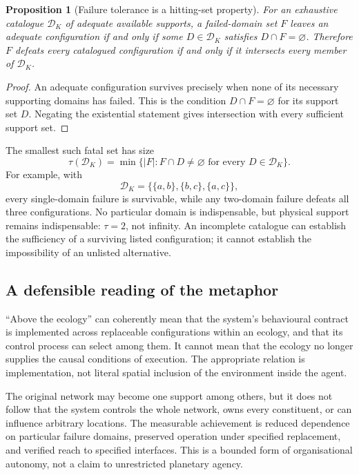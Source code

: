 \documentclass[11pt,a4paper]{article}
\newtheorem{proposition}[theorem]{Proposition}
\theoremstyle{definition}
\theoremstyle{remark}
\newcommand{\calK}{K}
\begin{document}
\begin{proposition}[Failure tolerance is a hitting-set property]\label{prop:hitting}
For an exhaustive catalogue $\mathscr D_{\calK}$ of adequate available supports, a failed-domain set $F$ leaves an adequate configuration if and only if some $D\in\mathscr D_{\calK}$ satisfies $D\cap F=\varnothing$. Therefore $F$ defeats every catalogued configuration if and only if it intersects every member of $\mathscr D_{\calK}$.
\end{proposition}
\begin{proof}
An adequate configuration survives precisely when none of its necessary supporting domains has failed. This is the condition $D\cap F=\varnothing$ for its support set $D$. Negating the existential statement gives intersection with every sufficient support set.
\end{proof}
The smallest such fatal set has size
\[
 \tau(\mathscr D_{\calK})
 =\min\{|F|:F\cap D\neq\varnothing\text{ for every }D\in\mathscr D_{\calK}\}.
\]
For example, with
\begin{equation}\label{eq:triangle}
 \mathscr D_{\calK}=\{\{a,b\},\{b,c\},\{a,c\}\},
\end{equation}
every single-domain failure is survivable, while any two-domain failure defeats all three configurations. No particular domain is indispensable, but physical support remains indispensable: $\tau=2$, not infinity. An incomplete catalogue can establish the sufficiency of a surviving listed configuration; it cannot establish the impossibility of an unlisted alternative.

\subsection{A defensible reading of the metaphor}
``Above the ecology'' can coherently mean that the system's behavioural contract is implemented across replaceable configurations within an ecology, and that its control process can select among them. It cannot mean that the ecology no longer supplies the causal conditions of execution. The appropriate relation is implementation, not literal spatial inclusion of the environment inside the agent.

The original network may become one support among others, but it does not follow that the system controls the whole network, owns every constituent, or can influence arbitrary locations. The measurable achievement is reduced dependence on particular failure domains, preserved operation under specified replacement, and verified reach to specified interfaces. This is a bounded form of organisational autonomy, not a claim to unrestricted planetary agency.
\end{document}
